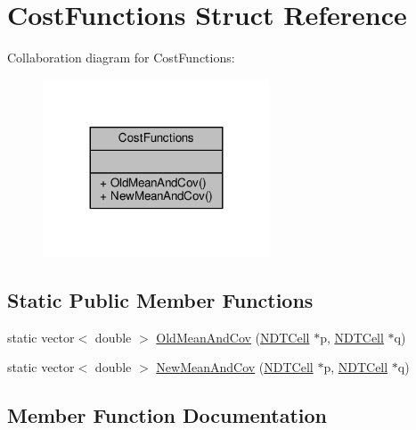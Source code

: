 \hypertarget{structCostFunctions}{}\section{Cost\+Functions Struct Reference}
\label{structCostFunctions}


Collaboration diagram for Cost\+Functions\+:\nopagebreak
\begin{figure}[H]
\begin{center}
\leavevmode
\includegraphics[width=191pt]{da/d4f/structCostFunctions__coll__graph}
\end{center}
\end{figure}
\subsection*{Static Public Member Functions}
\begin{DoxyCompactItemize}
\item 
static vector$<$ double $>$ \hyperlink{structCostFunctions_af66a9ae54dbf19549b3e98636134d3a7}{Old\+Mean\+And\+Cov} (\hyperlink{classNDTCell}{N\+D\+T\+Cell} $\ast$p, \hyperlink{classNDTCell}{N\+D\+T\+Cell} $\ast$q)
\item 
static vector$<$ double $>$ \hyperlink{structCostFunctions_ad62402cf996ea9c0812a6d584325ab25}{New\+Mean\+And\+Cov} (\hyperlink{classNDTCell}{N\+D\+T\+Cell} $\ast$p, \hyperlink{classNDTCell}{N\+D\+T\+Cell} $\ast$q)
\end{DoxyCompactItemize}


\subsection{Member Function Documentation}
\mbox{\label{structCostFunctions_ad62402cf996ea9c0812a6d584325ab25}} 
